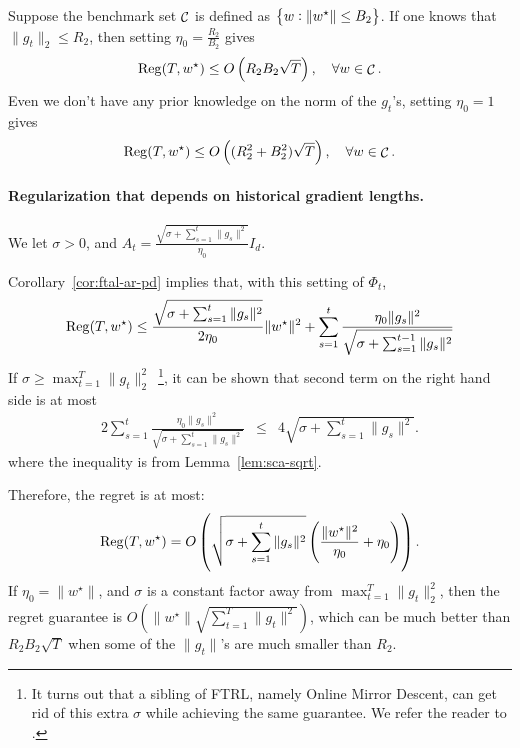 \documentclass{article}
\DeclareMathOperator*{\Reg}{{\rm Reg}}
\DeclareMathOperator*{\Ccal}{{\cal C}}
\begin{document}
Suppose the benchmark set $\Ccal$ is defined as $\cbr{w: \| w^\star \| \leq B_2}$.
If one knows that $\| g_t \|_2 \leq R_2$, then setting $\eta_0 = \frac{R_2}{B_2}$ gives
\[ \Reg(T, w^\star) \leq O\del{R_2 B_2 \sqrt{T}}, \quad \forall w \in \Ccal. \]
Even we don't have any prior knowledge on the norm of the $g_t$'s, setting $\eta_0 = 1$ gives
\[ \Reg(T, w^\star) \leq O\del{(R_2^2 + B_2^2) \sqrt{T}}, \quad \forall w \in \Ccal. \]

\paragraph{Regularization that depends on historical gradient lengths.} We let $\sigma > 0$, and $A_t = \frac{\sqrt{\sigma + \sum_{s=1}^{t} \| g_s \|^2}}{\eta_0} I_d$.

Corollary~\ref{cor:ftal-ar-pd} implies that, with this setting of $\Phi_t$,
\[ \Reg(T, w^\star) \leq \frac{\sqrt{\sigma + \sum_{s=1}^{t} \| g_s \|^2}}{2 \eta_0} \| w^\star \|^2 + \sum_{s=1}^t \frac{\eta_0 \| g_s \|^2}{\sqrt{\sigma + \sum_{s=1}^{t-1} \| g_s \|^2}}\]
If $\sigma \geq \max_{t=1}^T \| g_t \|_2^2$~\footnote{It turns out that a sibling of FTRL, namely Online Mirror Descent, can get rid of this extra $\sigma$ while achieving the same guarantee. We refer the reader to \cite[][Lecture 5]{orabona2019introduction}.}, it can be shown that second term on the right hand side is at most
\begin{eqnarray*}
 2 \sum_{s=1}^t \frac{\eta_0 \| g_s \|^2}{\sqrt{\sigma + \sum_{s=1}^{t} \| g_s \|^2}}
&\leq& 4 \sqrt{\sigma + \sum_{s=1}^{t} \| g_s \|^2}.
\end{eqnarray*}
where the inequality is from Lemma~\ref{lem:sca-sqrt}.

Therefore, the regret is at most:
\begin{eqnarray*}
 \Reg(T, w^\star) = O\del{ \sqrt{\sigma + \sum_{s=1}^{t} \| g_s \|^2} \del{\frac{\|w^\star\|^2}{\eta_0} + \eta_0} }.
\end{eqnarray*}
If $\eta_0 = \| w^\star \|$, and $\sigma$ is a constant factor away from $\max_{t=1}^T \| g_t \|_2^2$, then the regret guarantee is $O(\|w^\star\| \sqrt{\sum_{t=1}^{T} \| g_t \|^2})$, which can be much better than $R_2 B_2 \sqrt{T}$ when some of the $\|g_t\|$'s are much smaller than $R_2$.
\end{document}
